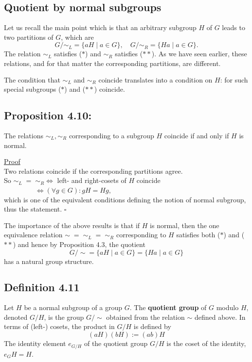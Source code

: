 \subsection*{Quotient by normal subgroups}

Let us recall the main point which is that an arbitrary subgroup $H$ of $G$ leads to two partitions of $G$, which are
$$G/{\sim_L} = \{ aH \mid a \in G \}, \quad G/{\sim_R} = \{ Ha \mid a \in G \}.$$
The relation $\sim_L$ satisfies ($*$) and $\sim_R$ satisfies ($**$). As we have seen earlier, these relations, and for that matter the corresponding partitions, are different.

The condition that $\sim_L$ and $\sim_R$ coincide translates into a condition on $H$: for such special subgroups ($*$) and ($**$) coincide.

\subsection*{Proposition 4.10:}
The relations $\sim_L, \sim_R$ corresponding to a subgroup $H$ coincide if and only if $H$ is normal.

\noindent\underline{Proof} \\
Two relations coincide if the corresponding partitions agree. \\
So $\sim_L \;=\; \sim_R \iff$ left- and right-cosets of $H$ coincide \\
$\phantom{\sim_L \;=\; \sim_R} \iff (\forall g \in G) : gH = Hg$, \\
which is one of the equivalent conditions defining the notion of normal subgroup, thus the statement. \hfill $\square$

\vspace{1em}

\noindent The importance of the above results is that if $H$ is normal, then the one equivalence relation $\sim \;=\; \sim_L \;=\; \sim_R$ corresponding to $H$ satisfies both ($*$) and ($**$) and hence by Proposition 4.3, the quotient
$$G/{\sim} = \{ aH \mid a \in G \} = \{ Ha \mid a \in G \}$$
has a natural group structure.

\subsection*{Definition 4.11}
Let $H$ be a normal subgroup of a group $G$. The \textbf{quotient group} of $G$ modulo $H$, denoted $G/H$, is the group $G/{\sim}$ obtained from the relation $\sim$ defined above. In terms of (left-) cosets, the product in $G/H$ is defined by
$$\boxed{(aH)(bH) := (ab)H}$$
The identity element $e_{G/H}$ of the quotient group $G/H$ is the coset of the identity, $e_G H = H$.

